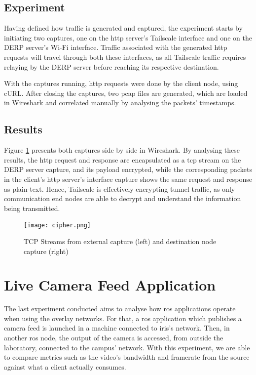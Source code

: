 \documentclass[11pt,twoside,a4paper]{report}
\begin{document}
\subsection{Experiment}

Having defined how traffic is generated and captured, the experiment starts by initiating two captures, one on the \ac{http} server's Tailscale interface and one on the \ac{DERP} server's Wi-Fi interface. Traffic associated with the generated \ac{http} requests will travel through both these interfaces, as all Tailscale traffic requires relaying by the \ac{DERP} server before reaching its respective destination.

With the captures running, \ac{http} requests were done by the client node, using cURL. After closing the captures, two pcap files are generated, which are loaded in Wireshark and correlated manually by analysing the packets' timestamps.

\subsection{Results}

Figure \ref{fig:cipher} presents both captures side by side in Wireshark. By analysing these results, the \ac{http} request and response are encapsulated as a \ac{tcp} stream on the \ac{DERP} server capture, and its payload encrypted, while the corresponding packets in the client's \ac{http} server's interface capture shows the same request and response as plain-text. Hence, Tailscale is effectively encrypting tunnel traffic, as only communication end nodes are able to decrypt and understand the information being transmitted.

\begin{figure}[h]
\centering
  \texttt{[image: cipher.png]}
  \caption{TCP Streams from external capture (left) and destination node capture (right)}
  \label{fig:cipher}
\end{figure}

\section{Live Camera Feed Application}

The last experiment conducted aims to analyse how \ac{ros} applications operate when using the overlay networks. For that, a \ac{ros} application which publishes a camera feed is launched in a machine connected to \ac{iris}'s network. Then, in another \ac{ros} node, the output of the camera is accessed, from outside the laboratory, connected to the campus' network. With this experiment, we are able to compare metrics such as the video's bandwidth and framerate from the source against what a client actually consumes.
\end{document}
